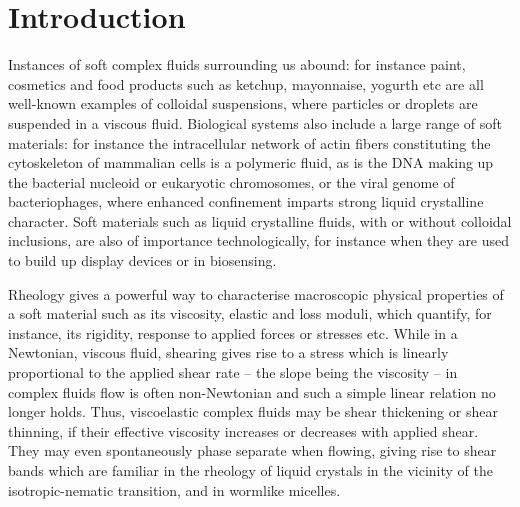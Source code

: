\documentclass[8.5pt,twoside,twocolumn]{article}
\begin{document}



\section{Introduction}
Instances of soft complex fluids surrounding us abound: for instance paint, cosmetics and food products such as ketchup, mayonnaise, yogurth etc are all well-known examples of colloidal suspensions, where particles or droplets are suspended in a viscous fluid. Biological systems also include a large range of soft materials: for instance the intracellular network of actin fibers constituting the cytoskeleton of mammalian cells is a polymeric fluid, as is the DNA making up the bacterial nucleoid or eukaryotic chromosomes, or the viral genome of bacteriophages, where enhanced confinement imparts strong liquid crystalline character. Soft materials such as liquid crystalline fluids, with or without colloidal inclusions, are also of importance technologically, for instance when they are used to build up display devices or in biosensing.

Rheology gives a powerful way to characterise macroscopic physical properties of a soft material such as its viscosity, elastic and loss moduli, which quantify, for instance, its rigidity, response to applied forces or stresses etc. While in a Newtonian, viscous fluid, shearing gives rise to a stress which is linearly proportional to the applied shear rate -- the slope being the viscosity -- in complex fluids flow is often non-Newtonian and such a simple linear relation no longer holds. Thus, viscoelastic complex fluids may be shear thickening or shear thinning, if their effective viscosity increases or decreases with applied shear. They may even spontaneously phase separate when flowing, giving rise to shear bands which are familiar in the rheology of liquid crystals in the vicinity of the isotropic-nematic transition, and in wormlike micelles.
\end{document}
